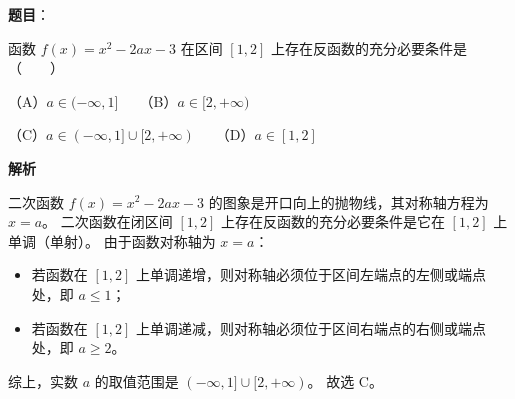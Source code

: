 \begin{answer}

\textbf{题目}：

函数 $f(x)=x^2-2ax-3$ 在区间 $[1, 2]$ 上存在反函数的充分必要条件是\mbox{（　　）}

（A）$a\in(-\infty, 1]$　　（B）$a\in[2, +\infty)$

（C）$a\in(-\infty, 1]\cup[2, +\infty)$　　（D）$a\in[1, 2]$

\textbf{解析}

二次函数 $f(x)=x^2-2ax-3$ 的图象是开口向上的抛物线，其对称轴方程为 $x=a$。
二次函数在闭区间 $[1, 2]$ 上存在反函数的充分必要条件是它在 $[1, 2]$ 上单调（单射）。
由于函数对称轴为 $x=a$：
\begin{itemize}
\item 若函数在 $[1, 2]$ 上单调递增，则对称轴必须位于区间左端点的左侧或端点处，即 $a\le 1$；
\item 若函数在 $[1, 2]$ 上单调递减，则对称轴必须位于区间右端点的右侧或端点处，即 $a\ge 2$。
\end{itemize}
综上，实数 $a$ 的取值范围是 $(-\infty, 1]\cup [2, +\infty)$。
故选 C。


\end{answer}
